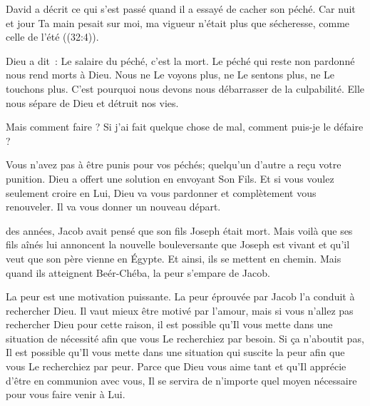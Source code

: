 
David a décrit ce qui s'est passé quand il a essayé de cacher son péché.
 \og Car nuit et jour Ta main pesait sur moi,
 ma vigueur n'était plus que sécheresse, comme celle de l'été \fg{}
 ((32:4)). 

Dieu a dit~: \og Le salaire du péché, c'est la mort. \fg{}
 Le péché qui reste non pardonné nous rend morts à Dieu.
 Nous ne Le voyons plus, ne Le sentons plus, ne Le touchons plus.
 C'est pourquoi nous devons nous débarrasser de la culpabilité.
 Elle nous sépare de Dieu et détruit nos vies. 

Mais comment faire ? Si j'ai fait quelque chose de mal,
 comment puis-je le \og défaire \fg{} ? 

Vous n'avez pas à être punis pour vos péchés;
 quelqu'un d'autre a reçu votre punition.
 Dieu a offert une solution en envoyant Son Fils.
 Et si vous voulez seulement croire en Lui,
 Dieu va vous pardonner et complètement vous renouveler.
 Il va vous donner un nouveau départ.

\dvrule






 des années,
 Jacob avait pensé que son fils Joseph était mort.
 Mais voilà que ses fils aînés lui annoncent la nouvelle bouleversante
 que Joseph est vivant et qu'il veut que son père vienne en Égypte.
 Et ainsi, ils se mettent en chemin.
 Mais quand ils atteignent Beér-Chéba, la peur s'empare de Jacob. 

La peur est une motivation puissante.
 La peur éprouvée par Jacob l'a conduit à rechercher Dieu.
 Il vaut mieux être motivé par l'amour,
 mais si vous n'allez pas rechercher Dieu pour cette raison,
 il est possible qu'Il vous mette dans une situation de nécessité
 afin que vous Le recherchiez par besoin.
 Si ça n'aboutit pas, Il est possible qu'Il vous mette
 dans une situation qui suscite la peur afin que vous Le recherchiez par peur.
 Parce que Dieu vous aime tant et qu'Il apprécie d'être en communion avec vous,
 Il se servira de n'importe quel moyen nécessaire pour vous faire venir à Lui.

